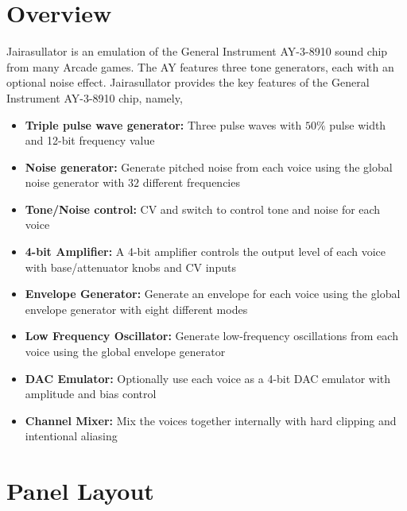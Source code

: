 \documentclass[12pt,letter]{article}
\begin{document}


\section*{Overview}

Jairasullator is an emulation of the General Instrument AY-3-8910 sound chip from many Arcade games. The AY features three tone generators, each with an optional noise effect. Jairasullator provides the key features of the General Instrument AY-3-8910 chip, namely,
\begin{itemize}
  \item \textbf{Triple pulse wave generator:} Three pulse waves with $50\%$ pulse width and 12-bit frequency value
  \item \textbf{Noise generator:} Generate pitched noise from each voice using the global noise generator with $32$ different frequencies
  \item \textbf{Tone/Noise control:} CV and switch to control tone and noise for each voice
  \item \textbf{4-bit Amplifier:} A 4-bit amplifier controls the output level of each voice with base/attenuator knobs and CV inputs
  \item \textbf{Envelope Generator:} Generate an envelope for each voice using the global envelope generator with eight different modes
  \item \textbf{Low Frequency Oscillator:} Generate low-frequency oscillations from each voice using the global envelope generator
  \item \textbf{DAC Emulator:} Optionally use each voice as a 4-bit DAC emulator with amplitude and bias control
  \item \textbf{Channel Mixer:} Mix the voices together internally with hard clipping and intentional aliasing
\end{itemize}


\clearpage
\section*{Panel Layout}
\end{document}
